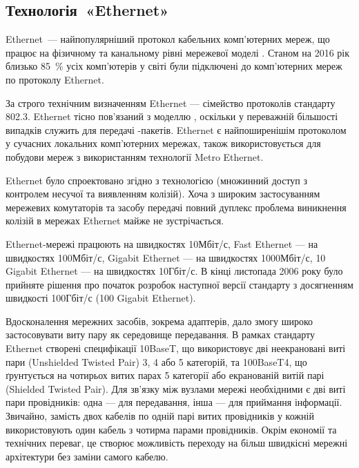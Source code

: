 \documentclass[
  ukrainian,
  simple,
  floatsection,
]{eskdnaukvd}
\begin{document}
    \subsection{Технологія~«\textenglish{Ethernet}»}
      \textenglish{Ethernet}~— найпопулярніший протокол кабельних комп'ютерних мереж, що працює на фізичному та канальному рівні мережевої моделі \textenglish{}. Станом на 2016 рік близько 85~\% усіх комп'ютерів у світі були підключені до комп'ютерних мереж по протоколу \textenglish{Ethernet}.

      За строго технічним визначенням \textenglish{Ethernet} — сімейство протоколів стандарту \textenglish{} 802.3. \textenglish{Ethernet} тісно пов'язаний з моделлю \textenglish{}, оскільки у переважній більшості випадків служить для передачі \textenglish{}-пакетів. \textenglish{Ethernet} є найпоширенішім протоколом у сучасних локальних комп'ютерних мережах, також використовується для побудови \textenglish{} мереж з використанням технології \textenglish{Metro Ethernet}.

      \textenglish{Ethernet} було спроектовано згідно з технологією \textenglish{} (множинний доступ з контролем несучої та виявленням колізій). Хоча з широким застосуванням мережевих комутаторів та засобу передачі повний дуплекс проблема виникнення колізій в мережах \textenglish{Ethernet} майже не зустрічається.

      \textenglish{Ethernet}-мережі працюють на швидкостях 10Мбіт/с, \textenglish{Fast Ethernet} — на швидкостях 100Мбіт/с, \textenglish{Gigabit Ethernet} — на швидкостях 1000Мбіт/с, \textenglish{10 Gigabit Ethernet} — на швидкостях 10Гбіт/с. В кінці листопада 2006 року було прийняте рішення про початок розробок наступної версії стандарту з досягненням швидкості 100Гбіт/с (\textenglish{100 Gigabit Ethernet}).

      Вдосконалення мережних засобів, зокрема адаптерів, дало змогу широко застосовувати виту пару як середовище передавання. В рамках стандарту \textenglish{Ethernet} створені специфікації \textenglish{10BaseT}, що використовує дві неекрановані виті пари \textenglish{ (Unshielded Twisted Pair)} 3, 4 або 5 категорій, та \textenglish{100BaseT4}, що ґрунтується на чотирьох витих парах \textenglish{} 5 категорії або екранованій витій парі \textenglish{ (Shielded Twisted Pair)}. Для зв'язку між вузлами мережі необхідними є дві виті пари провідників: одна — для передавання, інша — для приймання інформації. Звичайно, замість двох кабелів по одній парі витих провідників у кожній використовують один кабель з чотирма парами провідників. Окрім економії та технічних переваг, це створює можливість переходу на більш швидкісні мережні архітектури без заміни самого кабелю.
\end{document}

